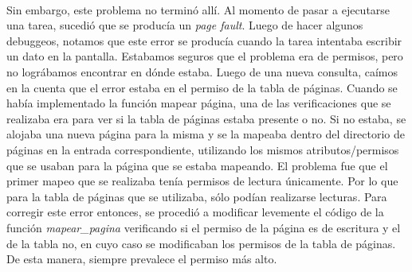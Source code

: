 \documentclass[11pt, a4paper]{article}
\begin{document}
	\paragraph{}
	Sin embargo, este problema no terminó allí. Al momento de pasar a ejecutarse una tarea, sucedió que se producía un \textit{page fault}. Luego de hacer algunos debuggeos, notamos que este error se producía cuando la tarea intentaba escribir un dato en la pantalla. Estabamos seguros que el problema era de permisos, pero no lográbamos encontrar en dónde estaba. Luego de una nueva consulta, caímos en la cuenta que el error estaba en el permiso de la tabla de páginas. Cuando se había implementado la función mapear página, una de las verificaciones que se realizaba era para ver si la tabla de páginas estaba presente o no. Si no estaba, se alojaba una nueva página para la misma y se la mapeaba dentro del directorio de páginas en la entrada correspondiente, utilizando los mismos atributos/permisos que se usaban para la página que se estaba mapeando. El problema fue que el primer mapeo que se realizaba tenía permisos de lectura únicamente. Por lo que para la tabla de páginas que se utilizaba, sólo podían realizarse lecturas. Para corregir este error entonces, se procedió a modificar levemente el código de la función \textit{mapear\_pagina} verificando si el permiso de la página es de escritura y el de la tabla no, en cuyo caso se modificaban los permisos de la tabla de páginas. De esta manera, siempre prevalece el permiso más alto.
\end{document}
